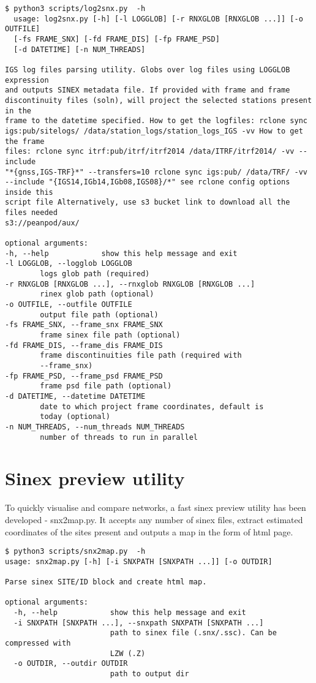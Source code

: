 \begin{lstlisting}[caption=log2snx.py help message]
$ python3 scripts/log2snx.py  -h
  usage: log2snx.py [-h] [-l LOGGLOB] [-r RNXGLOB [RNXGLOB ...]] [-o OUTFILE]
  [-fs FRAME_SNX] [-fd FRAME_DIS] [-fp FRAME_PSD]
  [-d DATETIME] [-n NUM_THREADS]

IGS log files parsing utility. Globs over log files using LOGGLOB expression
and outputs SINEX metadata file. If provided with frame and frame
discontinuity files (soln), will project the selected stations present in the
frame to the datetime specified. How to get the logfiles: rclone sync
igs:pub/sitelogs/ /data/station_logs/station_logs_IGS -vv How to get the frame
files: rclone sync itrf:pub/itrf/itrf2014 /data/ITRF/itrf2014/ -vv --include
"*{gnss,IGS-TRF}*" --transfers=10 rclone sync igs:pub/ /data/TRF/ -vv
--include "{IGS14,IGb14,IGb08,IGS08}/*" see rclone config options inside this
script file Alternatively, use s3 bucket link to download all the files needed
s3://peanpod/aux/

optional arguments:
-h, --help            show this help message and exit
-l LOGGLOB, --logglob LOGGLOB
        logs glob path (required)
-r RNXGLOB [RNXGLOB ...], --rnxglob RNXGLOB [RNXGLOB ...]
        rinex glob path (optional)
-o OUTFILE, --outfile OUTFILE
        output file path (optional)
-fs FRAME_SNX, --frame_snx FRAME_SNX
        frame sinex file path (optional)
-fd FRAME_DIS, --frame_dis FRAME_DIS
        frame discontinuities file path (required with
        --frame_snx)
-fp FRAME_PSD, --frame_psd FRAME_PSD
        frame psd file path (optional)
-d DATETIME, --datetime DATETIME
        date to which project frame coordinates, default is
        today (optional)
-n NUM_THREADS, --num_threads NUM_THREADS
        number of threads to run in parallel
\end{lstlisting}

\section{Sinex preview utility}\label{snx2map}

To quickly visualise and compare networks, a fast sinex preview utility has been developed - snx2map.py. It accepts any number of sinex files, extract estimated coordinates of the sites present and outputs a map in the form of html page.

\begin{lstlisting}[caption=snx2map.py help message]
$ python3 scripts/snx2map.py  -h
usage: snx2map.py [-h] [-i SNXPATH [SNXPATH ...]] [-o OUTDIR]

Parse sinex SITE/ID block and create html map.

optional arguments:
  -h, --help            show this help message and exit
  -i SNXPATH [SNXPATH ...], --snxpath SNXPATH [SNXPATH ...]
                        path to sinex file (.snx/.ssc). Can be compressed with
                        LZW (.Z)
  -o OUTDIR, --outdir OUTDIR
                        path to output dir
\end{lstlisting}



